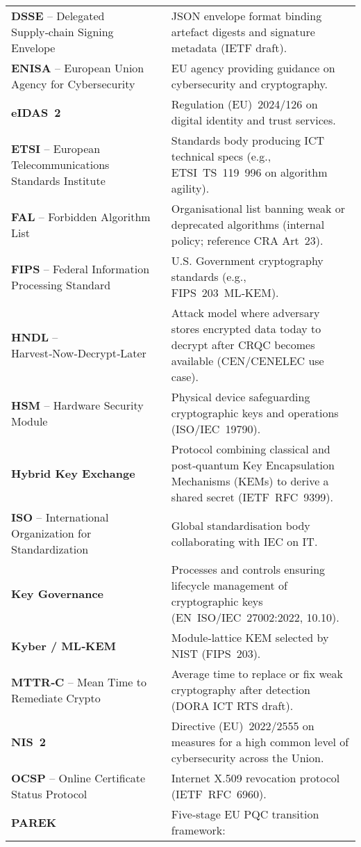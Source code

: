\documentclass[
  english,
]{article}
\begin{document}
\begin{longtable}[]{@{}
  >{\raggedright\arraybackslash}p{}
  >{\raggedright\arraybackslash}p{}@{}}
\textbf{DSSE} -- Delegated Supply‑chain Signing Envelope & JSON envelope
format binding artefact digests and signature metadata (IETF draft). \\
\textbf{ENISA} -- European Union Agency for Cybersecurity & EU agency
providing guidance on cybersecurity and cryptography. \\
\textbf{eIDAS~2} & Regulation (EU)~2024/126 on digital identity and
trust services. \\
\textbf{ETSI} -- European Telecommunications Standards Institute &
Standards body producing ICT technical specs (e.g., ETSI~TS~119~996 on
algorithm agility). \\
\textbf{FAL} -- Forbidden Algorithm List & Organisational list banning
weak or deprecated algorithms (internal policy; reference CRA
Art~23). \\
\textbf{FIPS} -- Federal Information Processing Standard & U.S.
Government cryptography standards (e.g., FIPS~203~ML‑KEM). \\
\textbf{HNDL} -- Harvest‑Now‑Decrypt‑Later & Attack model where
adversary stores encrypted data today to decrypt after CRQC becomes
available (CEN/CENELEC use case). \\
\textbf{HSM} -- Hardware Security Module & Physical device safeguarding
cryptographic keys and operations (ISO/IEC~19790). \\
\textbf{Hybrid Key Exchange} & Protocol combining classical and
post‑quantum Key Encapsulation Mechanisms (KEMs) to derive a shared
secret (IETF~RFC~9399). \\
\textbf{ISO} -- International Organization for Standardization & Global
standardisation body collaborating with IEC on IT. \\
\textbf{Key Governance} & Processes and controls ensuring lifecycle
management of cryptographic keys (EN~ISO/IEC~27002:2022, 10.10). \\
\textbf{Kyber / ML‑KEM} & Module‑lattice KEM selected by NIST
(FIPS~203). \\
\textbf{MTTR‑C} -- Mean Time to Remediate Crypto & Average time to
replace or fix weak cryptography after detection (DORA ICT RTS
draft). \\
\textbf{NIS~2} & Directive (EU)~2022/2555 on measures for a high common
level of cybersecurity across the Union. \\
\textbf{OCSP} -- Online Certificate Status Protocol & Internet X.509
revocation protocol (IETF~RFC~6960). \\
\textbf{PAREK} & Five‑stage EU PQC transition framework:

\end{longtable}
\end{document}
